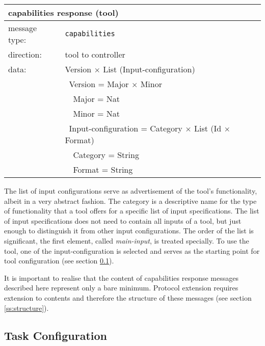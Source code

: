 \documentclass{article}
\newcommand{\msg}[1]{\texttt{#1}}
\begin{document}
   \begin{table}[H]
    \begin{center}
     \begin{tabular}{|ll|}
      \hline
       \multicolumn{2}{|l|}{\textbf{capabilities response (tool)}} \\
      \hline
       message type:   & \msg{capabilities} \\
      \hline
       direction:      & tool to controller \\
       data:           & Version $\times$ List (Input-configuration) \\
                       & \ Version = Major $\times$ Minor \\
                       & \ \ Major = Nat \\
                       & \ \ Minor = Nat \\
                       & \ Input-configuration = Category $\times$ List (Id $\times$ Format) \\
                       & \ \ Category = String \\
                       & \ \ Format = String \\
      \hline
     \end{tabular}
    \end{center}
    \vspace{-0.3cm}
   \end{table}

   \noindent The list of input configurations serve as advertisement of the
   tool's functionality, albeit in a very abstract fashion. The category is a
   descriptive name for the type of functionality that a tool offers for a
   specific list of input specifications. The list of input specifications does
   not need to contain all inputs of a tool, but just enough to distinguish it
   from other input configurations. The order of the list is significant, the
   first element, called \textit{main-input}, is treated specially. To use the
   tool, one of the input-configuration is selected and serves as the starting
   point for tool configuration (see section \ref{ss::task_configuration}).

   It is important to realise that the content of capabilities response
   messages described here represent only a bare minimum. Protocol extension
   requires extension to contents and therefore the structure of these
   messages (see section \ref{ss:structure}).

  \subsection{Task Configuration} \label{ss::task_configuration}
\end{document}
